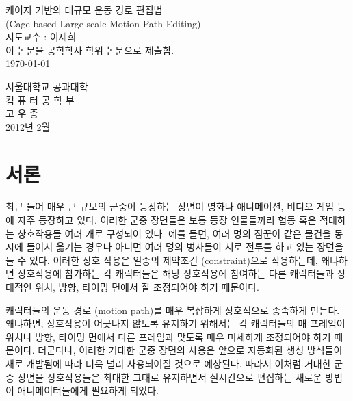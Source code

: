 \documentclass[12pt,a4paper,oneside,draft]{report}
\title{\thesistitle{}}
\author{고우종\\
서울대학교 컴퓨터공학부\\
\url{wjngkoh@gmail.com}
}
\date{\today}
\newcommand{\thesistitle}{케이지 기반의 대규모 운동 경로 편집법\\ (Cage-based Large-scale Motion Path Editing)}
\begin{document}
\begin{titlepage}
\begin{center}
{\LARGE \thesistitle{}}\\[4.0cm]

{\Large 지도교수 : 이제희}\\[1.5cm]

{\Large 이 논문을 공학학사 학위 논문으로 제출함.}\\[2.5cm]

{\Large \today}\\[1.5cm]
\vfill

\Large
서울대학교 공과대학\\
컴 퓨 터 공 학 부\\
고 우 종\\[1.0cm]
{\Large 2012년 2월}
\end{center}
\end{titlepage}

\maketitle

\begin{abstract}
Your abstract goes here...
\end{abstract}

\tableofcontents

\chapter{서론}
최근 들어 매우 큰 규모의 군중이 등장하는 장면이 영화나 애니메이션, 비디오 게임
등에 자주 등장하고 있다. 이러한 군중 장면들은 보통 등장 인물들끼리 협동 혹은
적대하는 상호작용들 여러 개로 구성되어 있다. 예를 들면, 여러 명의 짐꾼이 같은
물건을 동시에 들어서 옮기는 경우나 아니면 여러 명의 병사들이 서로 전투를 하고
있는 장면을 들 수 있다. 이러한 상호 작용은 일종의 제약조건 (constraint)으로
작용하는데, 왜냐하면 상호작용에 참가하는 각 캐릭터들은 해당 상호작용에 참여하는
다른 캐릭터들과 상대적인 위치, 방향, 타이밍 면에서 잘 조정되어야 하기 때문이다.


캐릭터들의 운동 경로 (motion path)를 매우 복잡하게 상호적으로 종속하게 만든다.
왜냐하면, 상호작용이 어긋나지 않도록 유지하기 위해서는 각 캐릭터들의 매
프레임이 위치나 방향, 타이밍 면에서 다른 프레임과 맞도록 매우 미세하게
조정되어야 하기 때문이다.  더군다나, 이러한 거대한 군중 장면의 사용은 앞으로
자동화된 생성 방식들이 새로 개발됨에 따라 더욱 널리 사용되어질 것으로 예상된다.
따라서 이처럼 거대한 군중 장면을 상호작용들은 최대한 그대로 유지하면서
실시간으로 편집하는 새로운 방법이 애니메이터들에게 필요하게 되었다.
\end{document}
